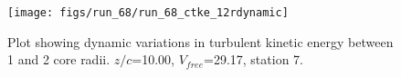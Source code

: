 \begin{figure}[H]
\centering
\texttt{[image: figs/run\_68/run\_68\_ctke\_12rdynamic]}
\caption{Plot showing dynamic variations in turbulent kinetic energy between 1 and 2 core radii. $z/c$=10.00, $V_{free}$=29.17, station 7.}
\label{fig:run_68_ctke_12rdynamic}
\end{figure}



